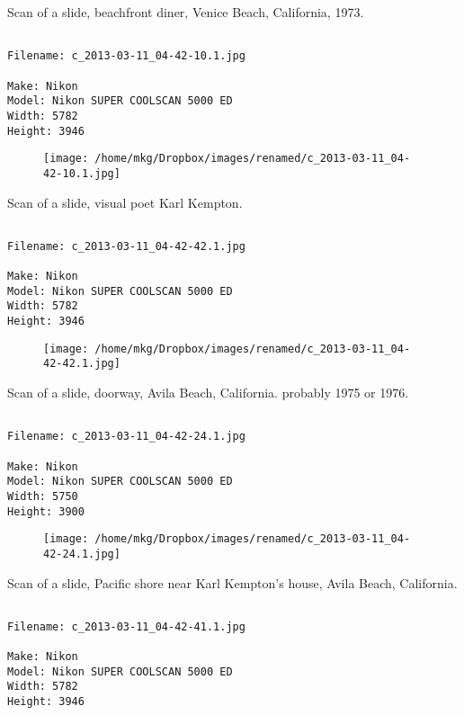 \clearpage
\onecolumn
\noindent Scan of a slide, beachfront diner, Venice Beach, California, 1973.
\noindent
\begin{lstlisting}

Filename: c_2013-03-11_04-42-10.1.jpg

Make: Nikon
Model: Nikon SUPER COOLSCAN 5000 ED
Width: 5782
Height: 3946
\end{lstlisting}
\clearpage

\begin{figure}
\texttt{[image: /home/mkg/Dropbox/images/renamed/c\_2013-03-11\_04-42-10.1.jpg]}
\end{figure}
    
\clearpage
\onecolumn
\noindent Scan of a slide, visual poet Karl Kempton.
\noindent
\begin{lstlisting}

Filename: c_2013-03-11_04-42-42.1.jpg

Make: Nikon
Model: Nikon SUPER COOLSCAN 5000 ED
Width: 5782
Height: 3946
\end{lstlisting}
\clearpage

\begin{figure}
\texttt{[image: /home/mkg/Dropbox/images/renamed/c\_2013-03-11\_04-42-42.1.jpg]}
\end{figure}
    
\clearpage
\onecolumn
\noindent Scan of a slide, doorway, Avila Beach, California. probably 1975 or 1976.
\noindent
\begin{lstlisting}

Filename: c_2013-03-11_04-42-24.1.jpg

Make: Nikon
Model: Nikon SUPER COOLSCAN 5000 ED
Width: 5750
Height: 3900
\end{lstlisting}
\clearpage

\begin{figure}
\texttt{[image: /home/mkg/Dropbox/images/renamed/c\_2013-03-11\_04-42-24.1.jpg]}
\end{figure}
    
\clearpage
\onecolumn
\noindent Scan of a slide, Pacific shore near Karl Kempton's house, Avila Beach, California.
\noindent
\begin{lstlisting}

Filename: c_2013-03-11_04-42-41.1.jpg

Make: Nikon
Model: Nikon SUPER COOLSCAN 5000 ED
Width: 5782
Height: 3946
\end{lstlisting}
\clearpage

